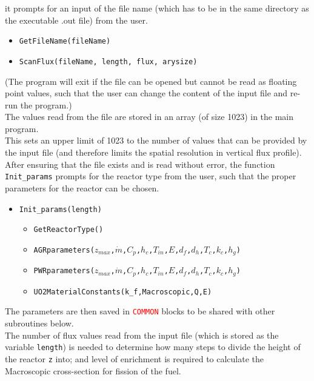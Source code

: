 \documentclass[a4paper, 12pt]{article}
\begin{document}
it prompts for an input of the file name (which has to be in the same directory as the executable .out file) from the user.
\begin{itemize}
	\item \texttt{\textcolor{subr}{GetFileName}(fileName)}
	\item \texttt{\textcolor{subr}{ScanFlux}(fileName, length, flux, arysize)}
\end{itemize}
(The program will exit if the file can be opened but cannot be read as floating point values, such that the user can change the content of the input file and re-run the program.)\\
The values read from the file are stored in an array (of size 1023) in the main program. \\
This sets an upper limit of 1023 to the number of values that can be provided by the input file (and therefore limits the spatial resolution in vertical flux profile).\\

After ensuring that the file exists and is read without error, the function \texttt{Init\_params} prompts for the reactor type from the user, such that the proper parameters for the reactor can be chosen.
\begin{itemize}
	\item \texttt{\textcolor{func}{Init\_params}(length)} 
	\begin{itemize}
		\item \texttt{\textcolor{func}{GetReactorType}()} 
		\item \texttt{\textcolor{subr}{AGRparameters}($z_{max}$,$\dot{m}$,$C_p$,$h_c$,$T_{in}$,$E$,$d_f$,$d_h$,$T_c$,$k_c$,$h_g$)}
		\item \texttt{\textcolor{subr}{PWRparameters}($z_{max}$,$\dot{m}$,$C_p$,$h_c$,$T_{in}$,$E$,$d_f$,$d_h$,$T_c$,$k_c$,$h_g$)}
		\item \texttt{\textcolor{subr}{UO2MaterialConstants}(k\_f,Macroscopic,Q,E)}
	\end{itemize}
\end{itemize}
The parameters are then saved in \texttt{\textcolor{red}{COMMON}} blocks to be shared with other subroutines below.\\
The number of flux values read from the input file (which is stored as the variable \texttt{length}) is needed to determine how many steps to divide the height of the reactor \texttt{z} into; and level of enrichment is required to calculate the Macroscopic cross-section for fission of the fuel.\\
\end{document}
